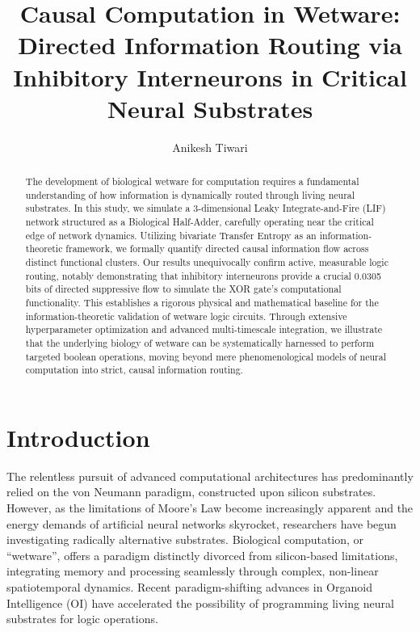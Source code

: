 \documentclass[12pt, a4paper]{article}
\title{\textbf{Causal Computation in Wetware: Directed Information Routing via Inhibitory Interneurons in Critical Neural Substrates}}
\author{Anikesh Tiwari}
\date{}
\begin{document}
\maketitle

\begin{abstract}
The development of biological wetware for computation requires a fundamental understanding of how information is dynamically routed through living neural substrates. In this study, we simulate a 3-dimensional Leaky Integrate-and-Fire (LIF) network structured as a Biological Half-Adder, carefully operating near the critical edge of network dynamics. Utilizing bivariate Transfer Entropy as an information-theoretic framework, we formally quantify directed causal information flow across distinct functional clusters. Our results unequivocally confirm active, measurable logic routing, notably demonstrating that inhibitory interneurons provide a crucial 0.0305 bits of directed suppressive flow to simulate the XOR gate's computational functionality. This establishes a rigorous physical and mathematical baseline for the information-theoretic validation of wetware logic circuits. Through extensive hyperparameter optimization and advanced multi-timescale integration, we illustrate that the underlying biology of wetware can be systematically harnessed to perform targeted boolean operations, moving beyond mere phenomenological models of neural computation into strict, causal information routing.
\end{abstract}

\section{Introduction}

The relentless pursuit of advanced computational architectures has predominantly relied on the von Neumann paradigm, constructed upon silicon substrates. However, as the limitations of Moore's Law become increasingly apparent and the energy demands of artificial neural networks skyrocket, researchers have begun investigating radically alternative substrates. Biological computation, or ``wetware'', offers a paradigm distinctly divorced from silicon-based limitations, integrating memory and processing seamlessly through complex, non-linear spatiotemporal dynamics. Recent paradigm-shifting advances in Organoid Intelligence (OI) have accelerated the possibility of programming living neural substrates for logic operations. 
\end{document}
